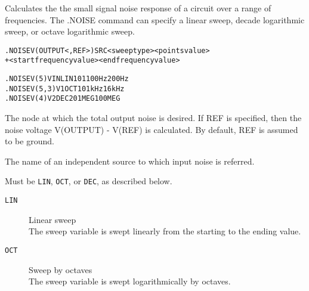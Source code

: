 



Calculates the the small signal noise response of a circuit over a range of frequencies.
The .NOISE command can specify a linear sweep, decade logarithmic sweep, or octave logarithmic sweep.

\begin{Command}

\format
\begin{alltt}
  .NOISE V(OUTPUT <, REF>) SRC <sweep type> <points value>
+ <start frequency value> <end frequency value>
\end{alltt}

\examples
\begin{alltt}
  .NOISE V(5) VIN LIN 101 100Hz 200Hz
  .NOISE V(5,3) V1 OCT 10 1kHz 16kHz
  .NOISE V(4) V2 DEC 20 1MEG 100MEG
\end{alltt}

\arguments

\begin{Arguments}

   The node at which the total output noise is desired. If REF is 
   specified, then the noise voltage V(OUTPUT) - V(REF) is calculated. By default, 
   REF is assumed to be ground. 

   The name of an independent source to which input noise is referred. 


Must be \texttt{LIN}, \texttt{OCT}, or \texttt{DEC}, as described below.
\begin{description}

\item[\tt LIN] Linear sweep\\
The sweep variable is swept linearly from the starting to the ending value.

\item[\tt OCT] Sweep by octaves\\
The sweep variable is swept logarithmically by octaves.


\end{description}
\end{Arguments}
\end{Command}
